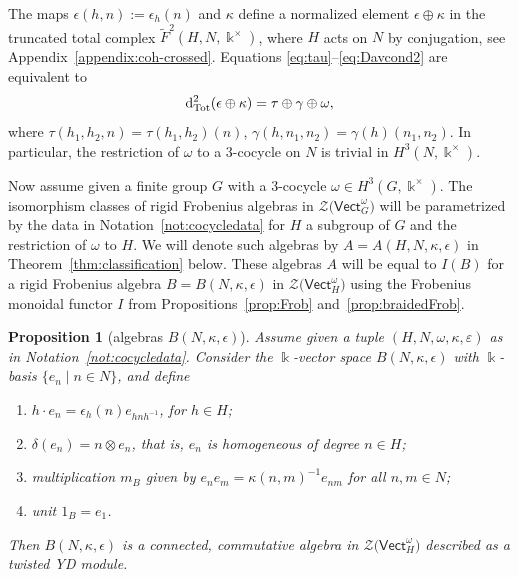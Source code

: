 \documentclass[pdftex]{sigma}
\numberwithin{equation}{section}
\newtheorem{Proposition}[Theorem]{Proposition}
 { \theoremstyle{definition}
\newtheorem{Definition}[Theorem]{Definition}
\newtheorem{Note}[Theorem]{Note}
\newtheorem{Notation}[Theorem]{Notation}
\newtheorem{Example}[Theorem]{Example}
\newtheorem{Remark}[Theorem]{Remark} }
\newcommand{\deri}{{\rm d}}
\newcommand{\wF}{\widetilde{F}}
\newcommand{\Tot}{\mathrm{Tot}}
\newcommand{\Vect}{\mathsf{Vect}}
\newcommand{\cZ}{\mathcal{Z}}
\newcommand{\rI}{I}
\begin{document}
\begin{Remark}\label{rem:Ntriv}
 The maps $\epsilon(h,n):=\epsilon_{h}(n)$ and $\kappa$ define a normalized element $\epsilon\oplus \kappa$ in the truncated total complex $\wF^2(H,N,\Bbbk^\times)$, where $H$ acts on $N$ by conjugation, see Appendix~\ref{appendix:coh-crossed}. Equations \eqref{eq:tau}--\eqref{eq:Davcond2} are equivalent to
 \begin{equation*}
 \deri_{\Tot}^2(\epsilon\oplus \kappa)=\tau\oplus \gamma \oplus \omega,
 \end{equation*}
 where $\tau(h_1,h_2,n)=\tau(h_1,h_2)(n)$, $\gamma(h,n_1,n_2)=\gamma(h)(n_1,n_2)$.
 In particular, the restriction of $\omega$ to a $3$-cocycle on $N$ is trivial in $H^3(N,\Bbbk^\times)$.
\end{Remark}

Now assume given a finite group $G$ with a $3$-cocycle $\omega\in H^3(G,\Bbbk^\times)$.
The isomorphism classes of rigid Frobenius algebras in $\cZ\big(\Vect_G^\omega\big)$ will be parametrized by the data in Notation~\ref{not:cocycledata} for $H$ a subgroup of $G$ and the restriction of $\omega$ to $H$. We will denote such algebras by $A=A(H,N,\kappa,\epsilon)$ in Theorem~\ref{thm:classification} below. These algebras $A$ will be equal to $\rI(B)$ for a rigid Frobenius algebra $B=B(N,\kappa,\epsilon)$ in $\cZ\big(\Vect_{H}^\omega\big)$ using the Frobenius monoidal functor $\rI$ from Propositions~\ref{prop:Frob} and~\ref{prop:braidedFrob}.

\begin{Proposition}[algebras $B(N,\kappa,\epsilon)$] \label{prop:B-algebra} Assume given a tuple $(H,N,\omega,\kappa,\varepsilon)$ as in Notation~{\rm \ref{not:cocycledata}}.
Consider the $\Bbbk$-vector space $B(N,\kappa, \epsilon)$ with $\Bbbk$-basis $\{ e_n \mid n\in N\}$, and define
 \begin{enumerate}\itemsep=0pt
 \item[$(i)$] $h \cdot e_n=\epsilon_h(n) e_{hnh^{-1}}$, for $h\in H$;
 \item[$(ii)$] $\delta(e_n)=n\otimes e_n$, that is, $e_n$ is homogeneous of degree $n\in H$;
 \item[$(iii)$] multiplication $m_B$ given by $e_n e_m = \kappa(n,m)^{-1} e_{nm}$ for all $ n,m\in N$;
 \item[$(iv)$] unit $1_B = e_{1}$.
 \end{enumerate}
 Then $B(N,\kappa, \epsilon)$ is a connected, commutative algebra in $\cZ\big(\Vect_H^\omega\big)$ described as a twisted YD module.
\end{Proposition}
\end{document}
